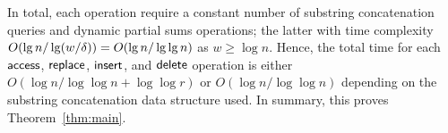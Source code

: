 In total, each operation require a constant number of substring concatenation queries and dynamic partial sums operations; the latter with time complexity $O(\lg n/\lg(w/\delta))=O(\lg n/\lg\lg n)$ as $w \geq \log n$. Hence, the total time for each $\mathsf{access}$, $\mathsf{replace}$, $\mathsf{insert}$, and $\mathsf{delete}$ operation is either $O(\log n/\log \log n + \log \log r)$ or $O(\log n/\log \log n)$ depending on the substring concatenation data structure used. In summary, this proves Theorem~\ref{thm:main}.



%
%
%
%
%


